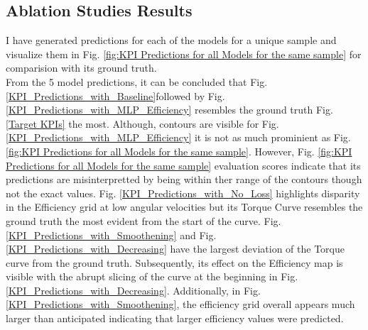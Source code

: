 \documentclass{report} %
\begin{document}
\subsection{Ablation Studies Results}
\label{subsec:Ablation Studies Results}
I have generated predictions for each of the models for a unique sample and visualize them in Fig. \ref{fig:KPI Predictions for all Models for the same sample} for 
comparision with its ground truth.\\
From the 5 model predictions, it can be concluded that Fig. \ref{KPI_Predictions_with_Baseline}followed by Fig. \ref{KPI_Predictions_with_MLP_Efficiency} resembles 
the ground truth Fig. \ref{Target KPIs} the most. Although, contours are visible for Fig. \ref{KPI_Predictions_with_MLP_Efficiency} it is not as much prominient as 
Fig. \ref{fig:KPI Predictions for all Models for the same sample}.
However, Fig. \ref{fig:KPI Predictions for all Models for the same sample} evaluation scores indicate that its predictions are misinterpretted by being within ther range 
of the contours though not the exact values. 
Fig. \ref{KPI_Predictions_with_No_Loss} highlights disparity in the Efficiency grid at low angular velocities but its Torque Curve resembles the ground truth the most evident 
from the start of the curve. 
Fig. \ref{KPI_Predictions_with_Smoothening} and Fig. \ref{KPI_Predictions_with_Decreasing} have the largest deviation of the Torque curve from the ground truth. Subsequently, 
its effect on the Efficiency map is visible with the abrupt slicing of the curve at the beginning in Fig. \ref{KPI_Predictions_with_Decreasing}.
Additionally, in Fig. \ref{KPI_Predictions_with_Smoothening}, the efficiency grid overall appears much larger than anticipated indicating that larger efficiency values were predicted.
\end{document}
